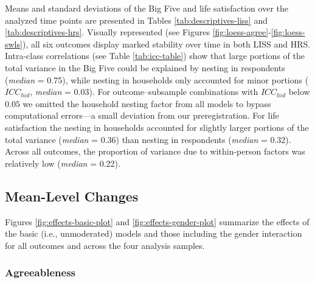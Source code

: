 \documentclass[
  english,
  man, noextraspace]{apa7}
\begin{document}
Means and standard deviations of the Big Five and life satisfaction over the analyzed time points are presented in Tables \ref{tab:descriptives-liss} and \ref{tab:descriptives-hrs}. Visually represented (see Figures \ref{fig:loess-agree}-\ref{fig:loess-swls}), all six outcomes display marked stability over time in both LISS and HRS. Intra-class correlations (see Table \ref{tab:icc-table}) show that large portions of the total variance in the Big Five could be explained by nesting in respondents (\emph{median} = 0.75), while nesting in households only accounted for minor portions (\(ICC_{hid}\), \emph{median} = 0.03). For outcome--subsample combinations with \(ICC_{hid}\) below \(0.05\) we omitted the household nesting factor from all models to bypass computational errors---a small deviation from our preregistration. For life satisfaction the nesting in households accounted for slightly larger portions of the total variance (\emph{median} = 0.36) than nesting in respondents (\emph{median} = 0.32). Across all outcomes, the proportion of variance due to within-person factors was relatively low (\emph{median} = 0.22).

\hypertarget{mean-level-changes}{%
\subsection{Mean-Level Changes}\label{mean-level-changes}}

Figures \ref{fig:effects-basic-plot} and \ref{fig:effects-gender-plot} summarize the effects of the basic (i.e., unmoderated) models and those including the gender interaction for all outcomes and across the four analysis samples.

\hypertarget{agreeableness}{%
\subsubsection{Agreeableness}\label{agreeableness}}
\end{document}

